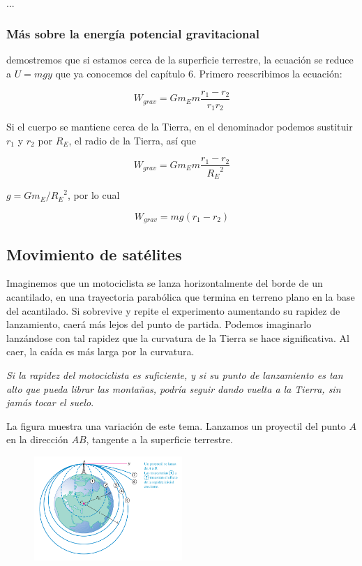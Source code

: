 \documentclass{article}
\newcommand{\newsubsection}[1]{
    \vspace{0.5cm}
    \color{sectionColor}
    \subsection{\bl{#1}}
    \color{black}
    \vspace{0.5cm}
}
\newcommand{\newtitle}[1]{
    \color{titleColor}
    \subsubsection{#1}
    \color{black}
}
\newcommand{\newex}[1]{
    \vspace{0.5cm}
    \noindent{\large \color{exerciceColor} \textbf{#1}}\\[0.2cm]
}
\newcommand{\bl}[1]{\textbf{#1}}
\begin{document}
    \newex{Solución 28.}

    \par ...

    \newtitle{Más sobre la energía potencial gravitacional}

    \par demostremos que si estamos cerca de la superﬁcie terrestre, la ecuación se reduce a $U = mgy$ que ya conocemos del capítulo 6. Primero reescribimos la ecuación:

    \[ W_{grav} = G m_E m \frac{r_1 - r_2}{r_1 r_2} \]

    \par Si el cuerpo se mantiene cerca de la Tierra, en el denominador podemos sustituir $r_1$ y $r_2$ por $R_E$, el radio de la Tierra, así que

    \[ W_{grav} = G m_E m \frac{r_1 - r_2}{{R_E}^2} \]

    \noindent $g = G m_E / {R_E}^2$, por lo cual

    \[ W_{grav} = m g (r_1 - r_2) \]

    \newsubsection{Movimiento de satélites}

    \par Imaginemos que un motociclista se lanza horizontalmente del borde de un acantilado, en una trayectoria parabólica que termina en terreno plano en la base del acantilado. Si sobrevive y repite el experimento aumentando su rapidez de lanzamiento, caerá más lejos del punto de partida. Podemos imaginarlo lanzándose con tal rapidez que la curvatura de la Tierra se hace signiﬁcativa. Al caer, la caída es más larga por la curvatura.

    \par \textit{Si la rapidez del motociclista es suﬁciente, y si su punto de lanzamiento es tan alto que pueda librar las montañas, podría seguir dando vuelta a la Tierra, sin jamás tocar el suelo}.

    \vspace{0.5cm}

    \par La ﬁgura muestra una variación de este tema. Lanzamos un proyectil del punto $A$ en la dirección $AB$, tangente a la superﬁcie terrestre.

    \begin{figure}[H]
        \centering
        \includegraphics[width=0.5\textwidth]{img/11.4-1.png}
    \end{figure}
\end{document}
